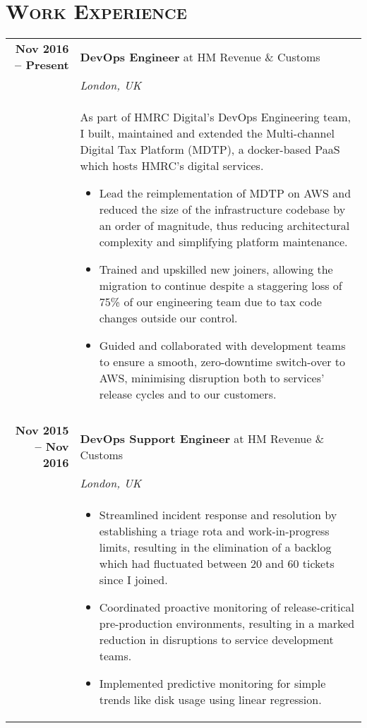 \documentclass[a4paper,10pt]{article} %
\begin{document}
\section{\textsc{Work Experience}}
\centering
\begin{tabularx}{\textwidth}{r|X}

\textbf{Nov 2016 -- Present}        & \textbf{DevOps Engineer} at HM Revenue \& Customs \\
                                    & \emph{London, UK} \\
                                    & \footnotesize
    {As part of HMRC Digital's DevOps Engineering team, I built, maintained and
    extended the Multi-channel Digital Tax Platform (MDTP), a docker-based PaaS
    which hosts HMRC's digital services.
    \begin{itemize}
    \item Lead the reimplementation of MDTP on AWS and reduced the size of the
    infrastructure codebase by an order of magnitude, thus reducing
    architectural complexity and simplifying platform maintenance.
    \item Trained and upskilled new joiners, allowing the migration to continue
    despite a staggering loss of 75\% of our engineering team due to tax code
    changes outside our control.
    \item Guided and collaborated with development teams to ensure a smooth,
    zero-downtime switch-over to AWS, minimising disruption both to services'
    release cycles and to our customers.
    \end{itemize}}\\

\multicolumn{2}{r}{} \\ %

\textbf{Nov 2015 -- Nov 2016}       & \textbf{DevOps Support Engineer} at HM Revenue \& Customs \\
                                    & \emph{London, UK} \\
                                    & \footnotesize
    {\begin{itemize}
    \item Streamlined incident response and resolution by establishing a triage
    rota and work-in-progress limits, resulting in the elimination of a backlog
    which had fluctuated between 20 and 60 tickets since I joined.
    \item Coordinated proactive monitoring of release-critical pre-production
    environments, resulting in a marked reduction in disruptions to service
    development teams.
    \item Implemented predictive monitoring for simple trends like disk usage
    using linear regression.
    \end{itemize}}\\


\end{tabularx}
\end{document}
